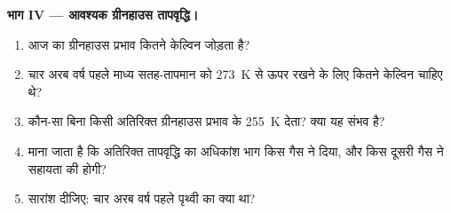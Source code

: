 \begin{problem}[{सप्ताहांत समस्या --- मंद युवा सूर्य}]
\medskip
\noindent\textbf{भाग IV --- आवश्यक ग्रीनहाउस तापवृद्धि।}
\begin{enumerate}[resume]
  \item आज का ग्रीनहाउस प्रभाव कितने केल्विन जोड़ता है?
  \item चार अरब वर्ष पहले माध्य सतह-तापमान को \qty{273}{K} से ऊपर
        रखने के लिए कितने केल्विन चाहिए थे?
  \item कौन-सा  बिना किसी अतिरिक्त ग्रीनहाउस प्रभाव के \qty{255}{K}
        देता? क्या यह संभव है?
  \item माना जाता है कि अतिरिक्त तापवृद्धि का अधिकांश भाग किस गैस ने दिया, और
        किस दूसरी गैस ने सहायता की होगी?
  \item सारांश दीजिए: चार अरब वर्ष पहले पृथ्वी का  क्या
        था?
\end{enumerate}
\end{problem}

